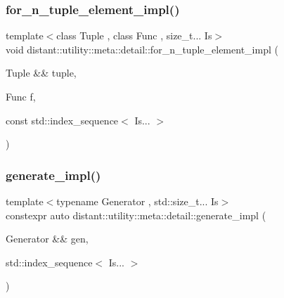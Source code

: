 \subsubsection{\texorpdfstring{for\+\_\+n\+\_\+tuple\+\_\+element\+\_\+impl()}{for\_n\_tuple\_element\_impl()}}
{\footnotesize\ttfamily template$<$class Tuple , class Func , size\+\_\+t... Is$>$ \\
void distant\+::utility\+::meta\+::detail\+::for\+\_\+n\+\_\+tuple\+\_\+element\+\_\+impl (\begin{DoxyParamCaption}\item[{Tuple \&\&}]{tuple,  }\item[{Func}]{f,  }\item[{const std\+::index\+\_\+sequence$<$ Is... $>$}]{ }\end{DoxyParamCaption})\hspace{0.3cm}{\ttfamily [noexcept]}}

\mbox{\label{namespacedistant_1_1utility_1_1meta_1_1detail_a914f9cdfce593fb74157a09dd74ccf33}} 
\subsubsection{\texorpdfstring{generate\+\_\+impl()}{generate\_impl()}}
{\footnotesize\ttfamily template$<$typename Generator , std\+::size\+\_\+t... Is$>$ \\
constexpr auto distant\+::utility\+::meta\+::detail\+::generate\+\_\+impl (\begin{DoxyParamCaption}\item[{Generator \&\&}]{gen,  }\item[{std\+::index\+\_\+sequence$<$ Is... $>$}]{ }\end{DoxyParamCaption})\hspace{0.3cm}{\ttfamily [noexcept]}}

\mbox{\label{namespacedistant_1_1utility_1_1meta_1_1detail_a0824a52171ef3f8f87f4da725fa31882}} 
